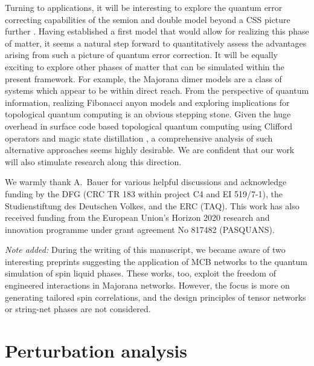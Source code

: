 \documentclass[twocolumn,floats,prx,showpacs]{revtex4-1}
\begin{document}
Turning to applications, it will be interesting to explore the quantum error correcting capabilities of the semion and double model
beyond a CSS picture further \cite{SemionErrorCorrection}. Having established a first model that would allow for realizing this phase of matter,
it seems a natural step forward to quantitatively assess the advantages arising from such a picture of quantum error correction. 
It will be equally exciting  to explore other phases of matter that can be simulated within the 
present framework. For example, the Majorana dimer models \cite{PhysRevB.94.115115,PhysRevB.94.115127} are a class of systems which appear to be within direct reach.
From the perspective of quantum information, realizing
Fibonacci anyon models \cite{Levin2005}  and exploring  implications 
for topological quantum computing is an obvious stepping stone. Given the huge overhead in surface code based topological quantum computing using Clifford operators and magic state distillation \cite{PhysRevA.71.022316}, 
a comprehensive analysis of such alternative approaches seems highly desirable. 
We are confident that our work will also stimulate research along this direction.

\begin{acknowledgements}
We warmly thank A.\ Bauer for various helpful discussions and acknowledge funding by the DFG (CRC TR 183 within project C4 and EI 519/7-1),
the Studienstiftung des Deutschen Volkes, and the ERC (TAQ). This work has also received funding from the European Union's Horizon 2020 research and innovation 
programme under grant agreement No 817482 (PASQUANS). 

\emph{Note added:}  During the writing of this manuscript, we became aware of two  interesting preprints
\cite{Sagi2018,Thomson2018}  suggesting the application of  MCB networks  to the quantum simulation 
of spin liquid phases. These works, too, exploit the freedom of  engineered  
interactions in Majorana networks. However, the focus is more on generating tailored spin correlations,  and the design principles of tensor networks  or string-net phases are not considered.  
\end{acknowledgements}

\appendix*
\section{Perturbation analysis} \label{secA}
\end{document}
